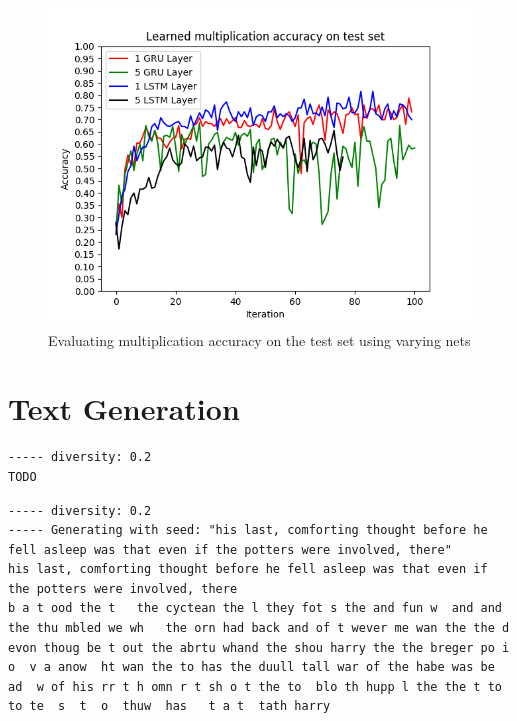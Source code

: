 \documentclass{article}[]
\begin{document}
\begin{figure}[H]
\centering
\includegraphics[width=1\linewidth]{img/multiply}
\caption{Evaluating multiplication accuracy on the test set using varying nets}
\label{fig:multiply}
\end{figure}


\appendix
\section{Text Generation}
\begin{lstlisting}[label=nietzsche-low-diverse, caption={Nietzsche after 60 epochs}]
----- diversity: 0.2
TODO
\end{lstlisting}

\begin{lstlisting}[label=lstm-harry-all-low-diverse, caption={LSTM Harry Potter after 60 epochs, diversity=0.2}]
----- diversity: 0.2
----- Generating with seed: "his last, comforting thought before he fell asleep was that even if the potters were involved, there"
his last, comforting thought before he fell asleep was that even if the potters were involved, there
b a t ood the t   the cyctean the l they fot s the and fun w  and and the thu mbled we wh   the orn had back and of t wever me wan the the d evon thoug be t out the abrtu whand the shou harry the the breger po i o  v a anow  ht wan the to has the duull tall war of the habe was be ad  w of his rr t h omn r t sh o t the to  blo th hupp l the the t to to te  s  t  o  thuw  has   t a t  tath harry
\end{lstlisting}
\end{document}
